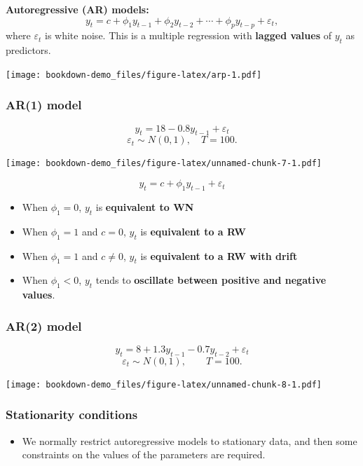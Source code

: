 \documentclass[]{book}
\providecommand{\tightlist}{%
  \setlength{\itemsep}{0pt}\setlength{\parskip}{0pt}}
\begin{document}
\textbf{Autoregressive (AR) models:}
\[y_{t} = c + \phi_{1}y_{t - 1} + \phi_{2}y_{t - 2} + \cdots + \phi_{p}y_{t - p} + \varepsilon_{t},\]
where \(\varepsilon_t\) is white noise. This is a multiple regression with \textbf{lagged values} of \(y_t\) as predictors.

\texttt{[image: bookdown-demo\_files/figure-latex/arp-1.pdf]}

\hypertarget{ar1-model}{%
\subsubsection{AR(1) model}\label{ar1-model}}

\[y_{t} = 18 -0.8 y_{t - 1} + \varepsilon_{t}\]
\[\varepsilon_t\sim N(0,1),\quad T=100.\]

\texttt{[image: bookdown-demo\_files/figure-latex/unnamed-chunk-7-1.pdf]}

\[y_{t} = c + \phi_1 y_{t - 1} + \varepsilon_{t}\]

\begin{itemize}
\tightlist
\item
  When \(\phi_1=0\), \(y_t\) is \textbf{equivalent to WN}
\item
  When \(\phi_1=1\) and \(c=0\), \(y_t\) is \textbf{equivalent to a RW}
\item
  When \(\phi_1=1\) and \(c\ne0\), \(y_t\) is \textbf{equivalent to a RW with drift}
\item
  When \(\phi_1<0\), \(y_t\) tends to \textbf{oscillate between positive and negative values}.
\end{itemize}

\hypertarget{ar2-model}{%
\subsubsection{AR(2) model}\label{ar2-model}}

\[y_t = 8 + 1.3y_{t-1} - 0.7 y_{t-2} + \varepsilon_t\]
\[\varepsilon_t\sim N(0,1), \qquad T=100.\]

\texttt{[image: bookdown-demo\_files/figure-latex/unnamed-chunk-8-1.pdf]}

\hypertarget{stationarity-conditions}{%
\subsubsection{Stationarity conditions}\label{stationarity-conditions}}

\begin{itemize}
\tightlist
\item
  We normally restrict autoregressive models to stationary data, and then some constraints on the values of the parameters are required.
\end{itemize}
\end{document}
